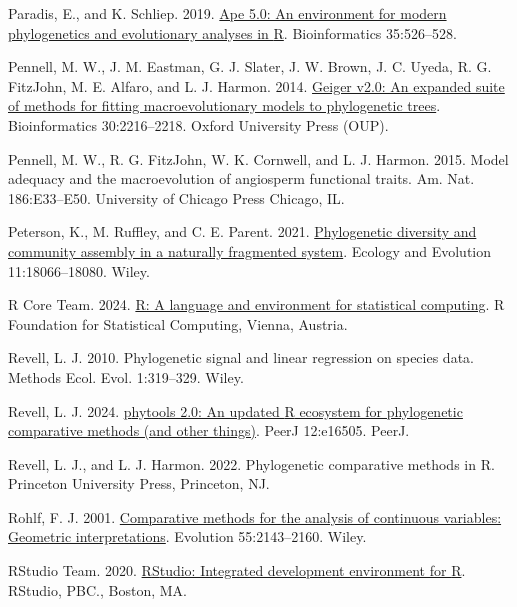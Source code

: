 \documentclass[fleqn,10pt,lineno]{wlpeerj} %
\newlength{\cslhangindent}
\newenvironment{CSLReferences}[2] %
 {\begin{list}{}{%
  \setlength{\itemindent}{0pt}
  \setlength{\leftmargin}{0pt}
  \setlength{\parsep}{0pt}
  \ifodd #1
   \setlength{\leftmargin}{\cslhangindent}
   \setlength{\itemindent}{-1\cslhangindent}
  \fi
  \setlength{\itemsep}{#2\baselineskip}}}
 {\end{list}}
\begin{document}
\begin{CSLReferences}{1}{0}
Paradis, E., and K. Schliep. 2019. \href{https://doi.org/10.1093/bioinformatics/bty633}{Ape 5.0: An environment for modern phylogenetics and evolutionary analyses in {R}}. Bioinformatics 35:526--528.

Pennell, M. W., J. M. Eastman, G. J. Slater, J. W. Brown, J. C. Uyeda, R. G. FitzJohn, M. E. Alfaro, and L. J. Harmon. 2014. \href{https://doi.org/10.1093/bioinformatics/btu181}{Geiger v2.0: An expanded suite of methods for fitting macroevolutionary models to phylogenetic trees}. Bioinformatics 30:2216--2218. Oxford University Press (OUP).

Pennell, M. W., R. G. FitzJohn, W. K. Cornwell, and L. J. Harmon. 2015. Model adequacy and the macroevolution of angiosperm functional traits. Am. Nat. 186:E33--E50. University of Chicago Press Chicago, IL.

Peterson, K., M. Ruffley, and C. E. Parent. 2021. \href{https://doi.org/10.1002/ece3.8404}{Phylogenetic diversity and community assembly in a naturally fragmented system}. Ecology and Evolution 11:18066--18080. Wiley.

R Core Team. 2024. \href{https://www.R-project.org/}{R: A language and environment for statistical computing}. R Foundation for Statistical Computing, Vienna, Austria.

Revell, L. J. 2010. Phylogenetic signal and linear regression on species data. Methods Ecol. Evol. 1:319--329. Wiley.

Revell, L. J. 2024. \href{https://doi.org/10.7717/peerj.16505}{{p}hytools 2.0: An updated {R} ecosystem for phylogenetic comparative methods (and other things)}. PeerJ 12:e16505. PeerJ.

Revell, L. J., and L. J. Harmon. 2022. Phylogenetic comparative methods in {R}. Princeton University Press, Princeton, NJ.

Rohlf, F. J. 2001. \href{https://doi.org/10.1111/j.0014-3820.2001.tb00731.x}{Comparative methods for the analysis of continuous variables: Geometric interpretations}. Evolution 55:2143--2160. Wiley.

RStudio Team. 2020. \href{http://www.rstudio.com/}{R{S}tudio: Integrated development environment for {R}}. RStudio, PBC., Boston, MA.


\end{CSLReferences}
\end{document}
